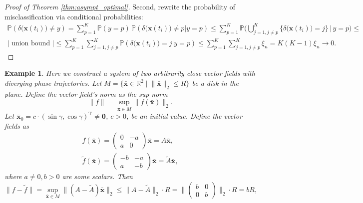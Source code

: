 \documentclass[referee, pdflatex, sn-mathphys-num]{sn-jnl}
\theoremstyle{definition}
\theoremstyle{plain}
\newtheorem{Ex}{Example}
\newcommand{\bx}{\ensuremath{\mathbf{x}}}
\newcommand{\bbx}{\ensuremath{\bar{\mathbf{x}}}}
\begin{document}
\begin{appendices}
\begin{proof}[Proof of Theorem \ref{thm:asympt_optimal}]
			Second, rewrite the probability of misclassification via conditional probabilities:
			\begin{multline*}
				\mathbb{P}(\delta \big( \bx(t_i) \big) \not= y) = \sum\limits_{p=1}^K \mathbb{P}(y = p) \, \mathbb{P}(\delta \big( \bx(t_i) \big) \not= p | y = p) \le \sum\limits_{p=1}^K \mathbb{P}\big( \bigcup_{j = 1, j \not=p}^{K} \{ \delta \big( \bx(t_i) \big) = j \} \,\big|\, y = p \big) \le \\ |\text{ union bound }| \le \sum\limits_{p=1}^K \sum\limits_{j = 1, j \not=p}^K \mathbb{P}( \delta \big( \bx(t_i) \big) = j | y = p) \le \sum\limits_{p=1}^K \sum\limits_{j = 1, j \not=p}^K \xi_n = K (K - 1) \xi_n \to 0.
			\end{multline*}
		\end{proof}
		
		\begin{Ex}\label{ex:approx_pathology}
			Here we construct a system of two arbitrarily close vector fields with diverging phase trajectories.
			Let $M = \{\bbx \in \mathbb{R}^2 \mid \lVert \bbx \rVert_2 \le R\}$ be a disk in the plane. Define the vector field's norm as the sup norm
			\begin{equation*}
				\lVert f \rVert = \underset{\bbx \in M}{\sup} \lVert f(\bbx) \rVert_2.
			\end{equation*}
			Let $\bbx_0 = c \cdot (\sin \gamma, \cos \gamma)^{\text{T}} \not= \mathbf{0}$, $c > 0$, be an initial value. Define the vector fields as
			\begin{gather*}
				f(\bbx) = \begin{pmatrix}
					0 & -a \\
					a & 0
				\end{pmatrix} \bbx = A \bbx, \\
				\tilde{f}(\bbx) = \begin{pmatrix}
					-b & -a \\
					a & -b
				\end{pmatrix} \bbx = \tilde{A} \bbx,
			\end{gather*}
			where $a \not= 0, b > 0$ are some scalars.  Then
			\begin{equation*}
				\lVert f - \tilde{f} \rVert = \underset{\bbx \in M}{\sup} \lVert (A - \tilde{A}) \bbx \rVert_2 \le \lVert A - \tilde{A} \rVert_2 \cdot R  = \lVert \begin{pmatrix}
					b & 0 \\
					0 & b
				\end{pmatrix} \rVert_2 \cdot R = b R,
			\end{equation*}

\end{Ex}
\end{appendices}
\end{document}
